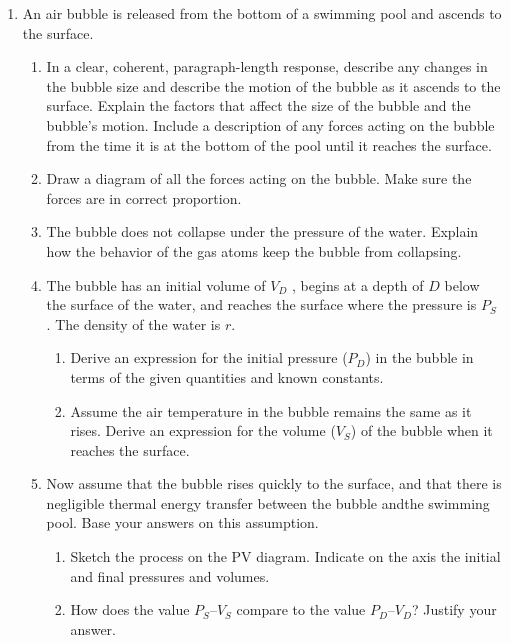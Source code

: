 \documentclass{../../oss-apphys}
\begin{document}
\begin{enumerate}[leftmargin=15pt]

\item An air bubble is released from the bottom of a swimming pool and
  ascends to the surface.
  \begin{enumerate}[leftmargin=18pt]
  \item In a clear, coherent, paragraph-length response, describe any
    changes in the bubble size and describe the motion of the bubble
    as it ascends to the surface. Explain the factors that affect the size
    of the bubble and the bubble's motion. Include a description of
    any forces acting on the bubble from the time it is at the bottom of
    the pool until it reaches the surface.
    \vspace{1.75in}
    
  \item Draw a diagram of all the forces acting on the bubble. Make sure
    the forces are in correct proportion.
    \vspace{1.75in}

  \item The bubble does not collapse under the pressure of the water.
    Explain how the behavior of the gas atoms keep the bubble from
    collapsing.
    \newpage
    
  \item The bubble has an initial volume of $V_D$ , begins at a depth of $D$
    below the surface of the water, and reaches the surface where the
    pressure is $P_S$ . The density of the water is $r$.
    \begin{enumerate}
    \item  Derive an expression for the initial pressure ($P_D$) in the bubble
      in terms of the given quantities and known constants.
    \item Assume the air temperature in the bubble remains the same as
      it rises. Derive an expression for the volume ($V_S$) of the bubble
      when it reaches the surface.
    \end{enumerate}
    \vspace{2in}
    
  \item Now assume that the bubble rises quickly to the surface, and that
    there is negligible thermal energy transfer between the bubble andthe
    swimming pool. Base your answers on this assumption.
    \begin{enumerate}
    \item Sketch the process on the PV diagram. Indicate on the axis the
      initial and final pressures and volumes.
    \item How does the value $P_S$--$V_S$ compare to the value $P_D$--$V_D$?
      Justify your answer.
    \end{enumerate}
    \vspace{1.75in}
    

\end{enumerate}
\end{enumerate}
\end{document}
